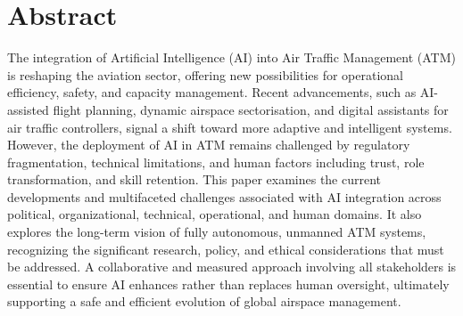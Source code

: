 \section*{Abstract} %


The integration of Artificial Intelligence (AI) into Air Traffic Management (ATM) is reshaping the aviation sector, offering new possibilities for operational efficiency, safety, and capacity management. 
Recent advancements, such as AI-assisted flight planning, dynamic airspace sectorisation, and digital assistants for air traffic controllers, signal a shift toward more adaptive and intelligent systems. 
However, the deployment of AI in ATM remains challenged by regulatory fragmentation, technical limitations, and human factors including trust, role transformation, and skill retention. 
This paper examines the current developments and multifaceted challenges associated with AI integration across political, organizational, technical, operational, and human domains. 
It also explores the long-term vision of fully autonomous, unmanned ATM systems, recognizing the significant research, policy, and ethical considerations that must be addressed. 
A collaborative and measured approach involving all stakeholders is essential to ensure AI enhances rather than replaces human oversight, ultimately supporting a safe and efficient evolution of global airspace management.

